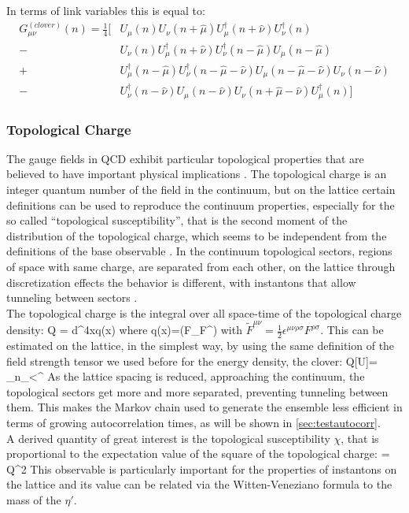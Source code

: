In terms of link variables this is equal to:
\begin{align}
    G_{\mu\nu}^{(clover)}(n)=\frac{1}{4}\bigg[  &U_\mu(n)U_\nu(n+\hat\mu)U^\dagger_\mu(n+\hat\nu)U^\dagger_\nu(n)\\\nonumber
    - &U_\nu(n)U^\dagger_\mu(n+\hat\nu)U^\dagger_\nu(n-\hat\mu)U_\mu(n-\hat\mu)\\\nonumber
    + &U^\dagger_\mu(n-\hat\mu)U^\dagger_\nu(n-\hat\mu-\hat\nu)U_\mu(n-\hat\mu-\hat\nu)U_\nu(n-\hat\nu)\\\nonumber
    - &U^\dagger_\nu(n-\hat\nu)U_\mu(n-\hat\nu)U_\nu(n+\hat\mu-\hat\nu)U^\dagger_\mu(n) \bigg]
\end{align}


\subsubsection{Topological Charge}
The gauge fields in QCD exhibit particular topological properties that are believed to have important physical implications \cite{witten_current_1979}\cite{di_giacomo_topology_1997}. The topological charge is an integer quantum number of the field in the continuum, but on the lattice certain definitions can be used to reproduce the continuum properties, especially for the so called ``topological susceptibility'', that is the second moment of the distribution of the topological charge, which seems to be independent from the definitions of the base observable \cite{alexandrou_comparison_2017}. In the continuum topological sectors, regions of space with same charge, are separated from each other, on the lattice through discretization effects the behavior is different, with instantons that allow tunneling between sectors \cite{gross_qcd_1981}.\\ 
The topological charge is the integral over all space-time of the topological charge density:
\beq
    Q = \int d^4xq(x)
\eeq
where
\beq 
    q(x)=\Tr(F_{\mu\nu}\tilde F^{\mu\nu}) 
\eeq 
with $\tilde F^{\mu\nu} = \frac{1}{2}\epsilon^{\mu\nu\rho\sigma} F^{\rho\sigma}$. This can be estimated on the lattice, in the simplest way, by using the same definition of the field strength tensor we used before for the energy density, the clover:
\beq
    Q[U]= \sum_{n\in\Lambda}\sum_{\mu<\nu}\epsilon^{\mu\nu\rho\sigma}
\eeq
As the lattice spacing is reduced, approaching the continuum, the topological sectors get more and more separated, preventing tunneling between them. This makes the Markov chain used to generate the ensemble less efficient in terms of growing autocorrelation times, as will be shown in \cref{sec:testautocorr}.\\
A derived quantity of great interest is the topological susceptibility $\chi$, that is proportional to the expectation value of the square of the topological charge:
\beq
    \chi = \langle Q^2 \rangle
\eeq
This observable is particularly important for the properties of instantons on the lattice and its value can be related via the Witten-Veneziano formula to the mass of the $\eta'$.

